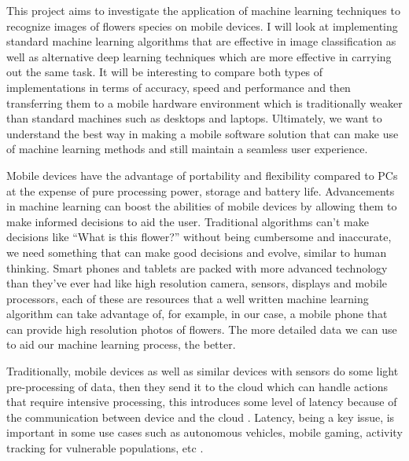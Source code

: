 \documentclass[12pt,a4paper]{report}
\begin{document}
\par

This project aims to investigate the application of machine learning techniques to recognize images of flowers species 
on mobile devices. I will look at implementing standard machine learning algorithms that are effective in image 
classification as well as alternative deep learning techniques which are more effective in carrying out the same task. 
It will be interesting to compare both types of implementations in terms of accuracy, speed and performance and then 
transferring them to a mobile hardware environment which is traditionally weaker than standard machines such as desktops
and laptops. Ultimately, we want to understand the best way in making a mobile software solution that can make use of 
machine learning methods and still maintain a seamless user experience.

\par

Mobile devices have the advantage of portability and flexibility compared to PCs at the expense of pure processing 
power, storage and battery life. Advancements in machine learning can boost the abilities of mobile devices by allowing 
them to make informed decisions to aid the user. Traditional algorithms can't make decisions like “What is this flower?”
without being cumbersome and inaccurate, we need something that can make good decisions and evolve, similar to human 
thinking. Smart phones and tablets are packed with more advanced technology than they've ever had like high resolution 
camera, sensors, displays and mobile processors, each of these are resources that a well written machine learning 
algorithm can take advantage of, for example, in our case, a mobile phone that can provide high resolution photos of 
flowers. The more detailed data we can use to aid our machine learning process, the better. 

\par

Traditionally, mobile devices as well as similar devices with sensors do some light pre-processing of data, then they 
send it to the cloud which can handle actions that require intensive processing, this introduces some level of latency 
because of the communication between device and the cloud \citep[p. 3]{olascoaga2021hardware}. 
Latency, being a key issue, is important in some use cases such as autonomous vehicles, mobile gaming, activity tracking
for vulnerable populations, etc \citep[pp. 3-4]{olascoaga2021hardware}.
\end{document}
